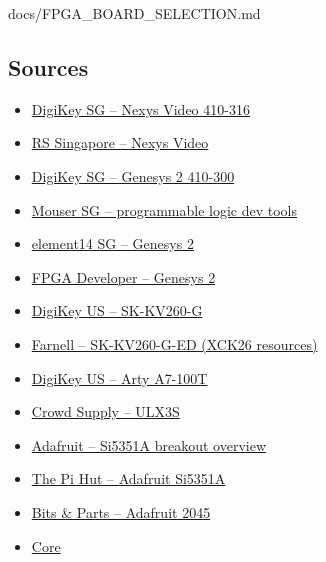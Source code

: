 \begin{relocated}{docs/FPGA_BOARD_SELECTION.md}
\subsection{Sources}\label{tm:dec:fpga-board-selection:sources}

\begin{itemize}
\tightlist
\item
  \href{https://www.digikey.sg/en/products/detail/digilent-inc/410-316/5456481}{DigiKey
  SG -- Nexys Video 410-316}
\item
  \href{https://sg.rs-online.com/web/p/fpga-development-tools/1346477}{RS
  Singapore -- Nexys Video}
\item
  \href{https://www.digikey.sg/en/products/detail/digilent-inc/410-300/5730862}{DigiKey
  SG -- Genesys 2 410-300}
\item
  \href{https://www.mouser.sg/c/semiconductors/engineering-development-tools/programmable-logic-ic-development-tools?pg=8}{Mouser
  SG -- programmable logic dev tools}
\item
  \href{https://sg.element14.com/digilent/410-300/dev-board-fpga/dp/2528808}{element14
  SG -- Genesys 2}
\item
  \href{https://boards.fpgadeveloper.com/boards/Genesys-2}{FPGA
  Developer -- Genesys 2}
\item
  \href{https://www.digikey.com/en/products/detail/amd/SK-KV260-G/13985269}{DigiKey
  US -- SK-KV260-G}
\item
  \href{https://fr.farnell.com/amd/sk-kv260-g-ed/kit-de-dem-64-bits-arm-cortex/dp/4719664}{Farnell
  -- SK-KV260-G-ED (XCK26 resources)}
\item
  \href{https://www.digikey.com/en/products/detail/digilent-inc/410-319-1/9445912}{DigiKey
  US -- Arty A7-100T}
\item
  \href{https://crowdsupply.com/radiona/ulx3s}{Crowd Supply -- ULX3S}
\item
  \href{https://learn.adafruit.com/adafruit-si5351-clock-generator-breakout/overview}{Adafruit
  -- Si5351A breakout overview}
\item
  \href{https://thepihut.com/products/adafruit-si5351a-clock-generator-breakout-board-8khz-to-160mhz}{The
  Pi Hut -- Adafruit Si5351A}
\item
  \href{https://www.bitsandparts.nl/en/Clock-generator-Si5351A-Breakout-8KHz-to-160MHz-Adafruit-2045-p100227}{Bits
  \& Parts -- Adafruit 2045}
\item
  \href{https://core-electronics.com.au/adafruit-si5351a-clock-generator-breakout-board-8khz-to-160mhz.html}{Core
}
\end{itemize}
\end{relocated}
